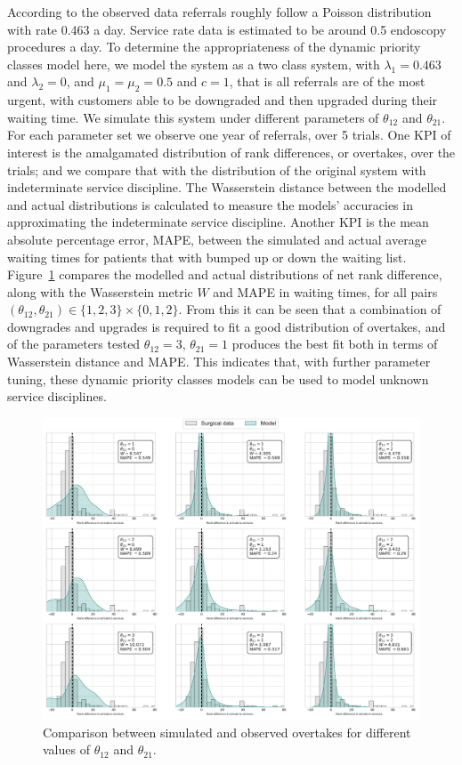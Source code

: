 \documentclass{article}
\begin{document}
According to the observed data referrals roughly follow a Poisson distribution
with rate 0.463 a day. Service rate data is estimated to be around 0.5
endoscopy procedures a day. To determine the appropriateness of the dynamic
priority classes model here, we model the system as a two class system, with
$\lambda_1 = 0.463$ and $\lambda_2 = 0$, and $\mu_1 = \mu_2 = 0.5$ and $c = 1$,
that is all referrals are of the most urgent, with customers able to be
downgraded and then upgraded during their waiting time. We simulate this
system under different parameters of $\theta_{12}$ and $\theta_{21}$. For each
parameter set we observe one year of referrals, over 5 trials. One KPI of
interest is the amalgamated distribution of rank differences, or overtakes,
over the trials; and we compare that with the
distribution of the original system with indeterminate service discipline. The
Wasserstein distance \cite{mostafaei11} between the modelled and actual
distributions is calculated to measure the models' accuracies in approximating
the indeterminate service discipline.
Another KPI is the mean absolute percentage error, MAPE, between the simulated
and actual average waiting times for patients that with bumped up or down the
waiting list.
Figure~\ref{fig:fitting_theta} compares the modelled and actual distributions of
net rank difference, along with the Wasserstein metric $W$ and MAPE in waiting
times, for all pairs
$\left(\theta_{12}, \theta_{21}\right) \in \{1, 2, 3\}\times\{0, 1, 2\}$. From
this it can be seen that a combination of downgrades and upgrades is required to
fit a good distribution of overtakes, and of the parameters tested
$\theta_{12}=3$, $\theta_{21}=1$ produces the best fit both in terms of
Wasserstein distance and MAPE. This indicates that, with further parameter
tuning, these dynamic priority classes models can be used to model unknown
service disciplines.

\begin{figure}
  \begin{center}
    \includegraphics[width=\textwidth]{img/fitting_theta.pdf}
  \end{center}
  \caption{Comparison between simulated and observed overtakes for different
  values of $\theta_{12}$ and $\theta_{21}$.}
  \label{fig:fitting_theta}
\end{figure}
\end{document}
